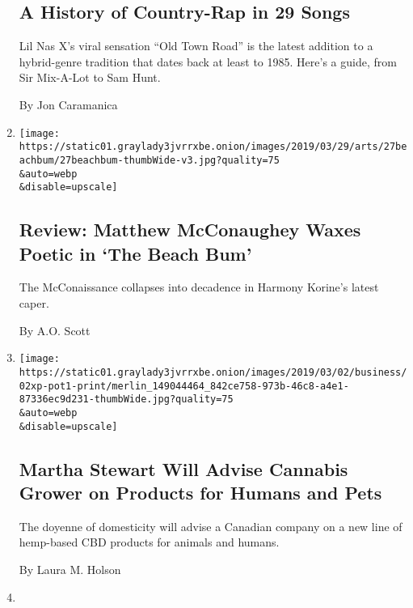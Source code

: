 \begin{enumerate}
  \hypertarget{a-history-of-country-rap-in-29-songs}{%
  \subsection{A History of Country-Rap in 29
  Songs}\label{a-history-of-country-rap-in-29-songs}}

  Lil Nas X's viral sensation ``Old Town Road'' is the latest addition
  to a hybrid-genre tradition that dates back at least to 1985. Here's a
  guide, from Sir Mix-A-Lot to Sam Hunt.

  By Jon Caramanica
\item
  \href{/2019/03/27/movies/the-beach-bum-review.html}{}

  \texttt{[image: https://static01.graylady3jvrrxbe.onion/images/2019/03/29/arts/27beachbum/27beachbum-thumbWide-v3.jpg?quality=75\\\&auto=webp\\\&disable=upscale]}

  \hypertarget{review-matthew-mcconaughey-waxes-poetic-in-the-beach-bum}{%
  \subsection{Review: Matthew McConaughey Waxes Poetic in `The Beach
  Bum'}\label{review-matthew-mcconaughey-waxes-poetic-in-the-beach-bum}}

  The McConaissance collapses into decadence in Harmony Korine's latest
  caper.

  By A.O. Scott
\item
  \href{/2019/03/01/business/martha-stewart-cannabis-pot.html}{}

  \texttt{[image: https://static01.graylady3jvrrxbe.onion/images/2019/03/02/business/02xp-pot1-print/merlin\_149044464\_842ce758-973b-46c8-a4e1-87336ec9d231-thumbWide.jpg?quality=75\\\&auto=webp\\\&disable=upscale]}

  \hypertarget{martha-stewart-will-advise-cannabis-grower-on-products-for-humans-and-pets}{%
  \subsection{Martha Stewart Will Advise Cannabis Grower on Products for
  Humans and
  Pets}\label{martha-stewart-will-advise-cannabis-grower-on-products-for-humans-and-pets}}

  The doyenne of domesticity will advise a Canadian company on a new
  line of hemp-based CBD products for animals and humans.

  By Laura M. Holson
\item
  \href{/2019/02/13/us/politics/kamala-harris-snoop-tupac.html}{}


\end{enumerate}
